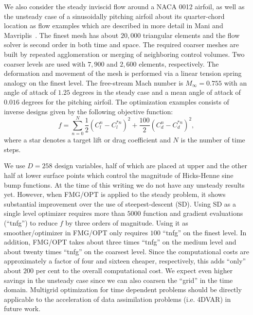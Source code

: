 \documentclass{report}
\begin{document}
We also consider the steady inviscid flow around a NACA 0012 airfoil, as
well as the unsteady case of a sinusoidally pitching airfoil about its
quarter-chord location as flow examples
which are described in more detail in Mani and Mavriplis~\cite{Mani2008}.
The finest mesh has about $20,000$ triangular elements and the flow
solver is second order in both time and space.
The required coarser meshes are built by repeated agglomeration or
merging of neighboring control volumes.
Two coarser levels are used with $7,900$ and $2,600$ elements,
respectively. The deformation and movement of the mesh is performed via a
linear tension spring analogy on the finest level.
The free-stream Mach number is $M_\infty=0.755$ with an angle of attack
of $1.25$ degrees in the steady case and a mean angle of attack of
$0.016$ degrees for the
pitching airfoil. The optimization examples consists of inverse designs
given by the following objective function:
\begin{equation}
f=\sum_{n=0}^N \frac{1}{2} (C_l^n-C_l^{*n})^2 + \frac{100}{2} (C_d^n-C_d^{*n})^2,
\end{equation}
where a star denotes a target lift or drag coefficient and $N$ is the
number of time steps.

We use $D=258$ design variables, half of which are placed at upper and
the other half at lower surface points which control the magnitude of
Hicks-Henne sine bump functions.
At the time of this writing we do not have any unsteady results yet.
However, when FMG/OPT is applied to the steady problem, it shows
substantial improvement over the use of steepest-descent (SD).
Using SD as a single level optimizer requires more than $5000$ function
and gradient evaluations (``tnfg'') to reduce $f$ by three orders of
magnitude. Using it as smoother/optimizer in FMG/OPT
only requires $100$ ``tnfg'' on the finest level.
In addition, FMG/OPT takes about three times ``tnfg'' on the medium level
and about twenty times ``tnfg''
on the coarsest level. Since the computational costs are approximately
a factor of four and sixteen cheaper, respectively, this adds ``only''
about $200$ per cent to the overall computational cost.
We expect even higher savings in the unsteady case since we can also
coarsen the ``grid'' in the time domain. Multigrid optimization for time
dependent problems
should be directly applicable to the acceleration of data assimilation
problems (i.e. 4DVAR) in future work.
\end{document}
